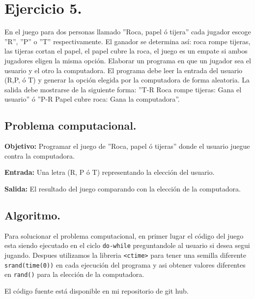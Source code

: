 \documentclass[12pt,letterpaper]{article}
\begin{document}
\section{Ejercicio 5.}

En el juego para dos personas llamado ''Roca, papel \'o tijera'' cada jugador escoge ''R'', ''P'' o ''T'' respectivamente. El ganador se determina as\'i: roca rompe tijeras, las tijeras cortan el papel, el papel cubre la roca, el juego es un empate si ambos jugadores eligen la misma opci\'on.
Elaborar un programa en que un jugador sea el usuario y el otro la computadora. El programa debe leer la entrada del usuario (R,P, \'o T) y generar la opci\'on elegida por la computadora de forma aleatoria. La salida debe mostrarse de la siguiente forma: ''T-R Roca rompe tijeras: Gana el usuario'' \'o ''P-R Papel cubre roca: Gana la computadora''.

\subsection{Problema computacional.}
\textbf{Objetivo:} Programar el juego de ''Roca, papel \'o tijeras'' donde el usuario juegue contra la computadora.

\textbf{Entrada:} Una letra (R, P \'o T) representando la elecci\'on del usuario.

\textbf{Salida:} El resultado del juego comparando con la elecci\'on de la computadora.

\subsection{Algoritmo.}
Para solucionar el problema computacional, en primer lugar el c\'odigo del juego esta siendo ejecutado en el ciclo \texttt{do-while} preguntandole al usuario si desea segui jugando. Despues utilizamos la libreria \texttt{<ctime>} para tener una semilla diferente \texttt{srand(time(0))} en cada ejecuci\'on del programa y asi obtener valores diferentes en \texttt{rand()} para la elecci\'on de la computadora.


El código fuente está disponible en mi repositorio de git hub. \cite{url:rock_piper}
\end{document}
